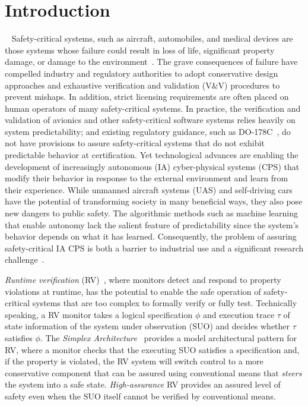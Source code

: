 \section{Introduction}~\label{sec:intro} Safety-critical systems, such
as aircraft, automobiles, and medical devices are those systems whose
failure could result in loss of life, significant property damage, or
damage to the environment~\cite{Knight2002}.  The grave consequences
of failure have compelled industry and regulatory authorities to adopt
conservative design approaches and exhaustive verification and
validation (V\&V) procedures to prevent mishaps. In addition, strict
licensing requirements are often placed on human operators of many
safety-critical systems.  In practice, the verification and validation
of avionics and other safety-critical software systems relies heavily
on system predictability; and existing regulatory guidance, such as
DO-178C~\cite{DO178B}, do not have provisions to assure
safety-critical systems that do not exhibit predictable behavior at
certification.  Yet technological advances are enabling the
development of increasingly autonomous (IA) cyber-physical systems (CPS)
that modify their behavior in response to the external environment and
learn from their experience.  While unmanned aircraft systems (UAS)
and self-driving cars have the potential of transforming society in
many beneficial ways, they also pose new dangers to public safety. The
algorithmic methods such as machine learning that enable autonomy lack
the salient feature of predictability since the system's behavior
depends on what it has learned.  Consequently, the problem of assuring
safety-critical IA CPS is both a barrier to industrial use  and a
significant  research challenge~\cite{NRC14}.


\emph{Runtime verification} (RV)~\cite{monitors}, where monitors
detect and respond to property violations at runtime, has the
potential to enable the safe operation of safety-critical systems that
are too complex to formally verify or fully test.  Technically
speaking, a RV monitor takes a logical specification $\phi$ and
execution trace $\tau$ of state information of the system under
observation (SUO) and decides whether $\tau$ satisfies $\phi$. The
\emph{Simplex Architecture}~\cite{simplex} provides a model
architectural pattern for RV, where a monitor checks that the
executing SUO satisfies a specification and, if the property is
violated, the RV system will switch control to a more conservative
component that can be assured using conventional means that
\emph{steers} the system into a safe state.  \emph{High-assurance} RV
provides an assured level of safety even when the SUO itself cannot be
verified by conventional means.

